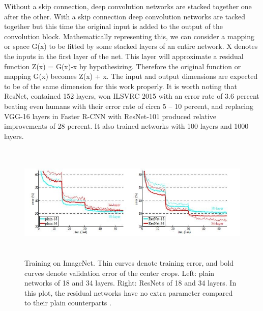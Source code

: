 {Without a skip connection, deep convolution networks are stacked together one after the other.  With a skip connection deep convolution networks are tacked together but this time the original input is added to the output of the convolution block.
Mathematically representing this, we can consider a mapping or space G(x) to be fitted by some stacked layers of an entire network.  X denotes the inputs in the first layer of the net. This layer will approximate a residual function Z(x) = G(x)-x by hypothesizing.  Therefore the original function or mapping G(x) becomes Z(x) + x.  The input and output dimensions are expected to be of the same dimension for this work properly.  It is worth noting that ResNet, contained 152 layers, won ILSVRC 2015 with an error rate of 3.6 percent beating even humans with their error rate of circa 5 – 10 percent, and replacing VGG-16 layers in Faster R-CNN with ResNet-101 produced relative improvements of 28 percent. It also trained networks with 100 layers and 1000 layers. 

\begin{figure}[H]
  \includegraphics[height=2.2in]{images/resnet-graph.jpg}
   \caption{Training on ImageNet. Thin curves denote training error, and bold curves denote validation error of the center crops. Left: plain networks of 18 and 34 layers. Right: ResNets of 18 and 34 layers. In this plot, the residual networks have no extra parameter compared to their plain counterparts \protect\cite{M}.}
\end{figure}

}
